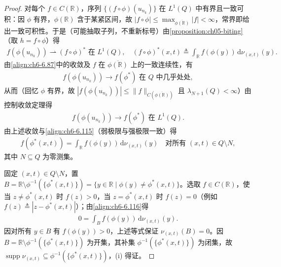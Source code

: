 \documentclass[../../main.tex]{subfiles}%
\begin{document}
\begin{proof}
对每个 $f\in C(\mathbb{R})$，序列 $\{(f\circ\phi)(u_{n_k})\}$ 在 $L^1(Q)$ 中有界且一致可积：因 $\phi$ 有界，$\phi(\mathbb{R})$ 含于某紧区间，故 $|f\circ\phi|\leqslant\max_{\overline{\phi(\mathbb{R})}}|f|<\infty$，常界即给出一致可积性。于是（可能抽取子列，不重新标号）由\cref{proposition:ch05-biting}（取 $h=f\circ\phi$）得
\begin{align}
f(\phi(u_{n_k}))\rightharpoonup(f\circ\phi)^* \text{ 在 }L^1(Q),\quad
(f\circ\phi)^*(x,t)\triangleq \int_\mathbb{R}f(\phi(y))\,\mathrm{d}\nu_{(x,t)}(y). \label{align:ch6-6.115}
\end{align}
由\eqref{align:ch6-6.87}中的收敛及 $f$ 在 $\overline{\phi(\mathbb{R})}$ 上的一致连续性，有
\begin{align*}
f(\phi(u_{n_k}))\to f(\phi^*) \text{ 在 }Q\text{ 中几乎处处},
\end{align*}
从而（回忆 $\phi$ 有界，故 $|f(\phi(u_{n_k}))|\leqslant\|f\|_{C(\overline{\phi(\mathbb{R})})}$ 且 $\lambda_{N+1}(Q)<\infty$）由控制收敛定理得
\begin{align*}
f(\phi(u_{n_k}))\to f(\phi^*) \text{ 在 }L^1(Q).
\end{align*}
由上述收敛与\eqref{align:ch6-6.115}（弱极限与强极限一致）得
\begin{align}
f(\phi^*(x,t))=\int_\mathbb{R}f(\phi(y))\,\mathrm{d}\nu_{(x,t)}(y)
\quad\text{对所有 }(x,t)\in Q\setminus N, \label{align:ch6-6.116}
\end{align}
其中 $N\subseteq Q$ 为零测集。

固定 $(x,t)\in Q\setminus N$，置 $B=\mathbb{R}\setminus\phi^{-1}(\{\phi^*(x,t)\})=\{y\in\mathbb{R}\mid\phi(y)\neq\phi^*(x,t)\}$。选取 $f\in C(\mathbb{R})$，使当 $z\neq\phi^*(x,t)$ 时 $f(z)>0$，当 $z=\phi^*(x,t)$ 时 $f(z)=0$（例如 $f(z)\triangleq|z-\phi^*(x,t)|$）；由\eqref{align:ch6-6.116}得
\begin{align*}
0=\int_B f(\phi(y))\,\mathrm{d}\nu_{(x,t)}(y).
\end{align*}
因对所有 $y\in B$ 有 $f(\phi(y))>0$，上述等式保证 $\nu_{(x,t)}(B)=0$。因 $B=\mathbb{R}\setminus\phi^{-1}(\{\phi^*(x,t)\})$ 为开集，其补集 $\phi^{-1}(\{\phi^*(x,t)\})$ 为闭集，故 $\operatorname{supp}\nu_{(x,t)}\subseteq\phi^{-1}(\{\phi^*(x,t)\})$，(i) 得证。


\end{proof}
\end{document}
